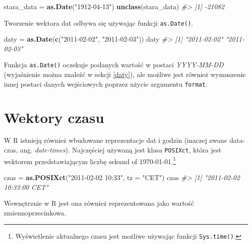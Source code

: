 \documentclass[paper=6in:9in,pagesize=pdftex,headinclude=on,footinclude=on,10pt]{scrbook}
\newenvironment{Shaded}{\begin{snugshade}}{\end{snugshade}}
\newcommand{\CommentTok}[1]{\textcolor[rgb]{0.56,0.35,0.01}{\textit{#1}}}
\newcommand{\DataTypeTok}[1]{\textcolor[rgb]{0.13,0.29,0.53}{#1}}
\newcommand{\KeywordTok}[1]{\textcolor[rgb]{0.13,0.29,0.53}{\textbf{#1}}}
\newcommand{\NormalTok}[1]{#1}
\newcommand{\StringTok}[1]{\textcolor[rgb]{0.31,0.60,0.02}{#1}}
\begin{document}
\begin{Shaded}
\begin{Highlighting}[]
\NormalTok{stara_data =}\StringTok{ }\KeywordTok{as.Date}\NormalTok{(}\StringTok{"1912-04-13"}\NormalTok{)}
\KeywordTok{unclass}\NormalTok{(stara_data)}
\CommentTok{#> [1] -21082}
\end{Highlighting}
\end{Shaded}

Tworzenie wektora dat odbywa się używając funkcji \texttt{as.Date()}.

\begin{Shaded}
\begin{Highlighting}[]
\NormalTok{daty =}\StringTok{ }\KeywordTok{as.Date}\NormalTok{(}\KeywordTok{c}\NormalTok{(}\StringTok{"2011-02-02"}\NormalTok{, }\StringTok{"2011-02-03"}\NormalTok{))}
\NormalTok{daty}
\CommentTok{#> [1] "2011-02-02" "2011-02-03"}
\end{Highlighting}
\end{Shaded}

Funkcja \texttt{as.Date()} oczekuje podanych wartość w postaci \emph{YYYY-MM-DD} (wyjaśnienie można znaleźć w sekcji \ref{daty}), ale możliwe jest również wymuszenie innej postaci danych wejściowych poprzez użycie argumentu \texttt{format}.

\hypertarget{ime}{%
\section{Wektory czasu}\label{ime}}

W R istnieją również wbudowane reprezentacje dat i godzin (inaczej zwane data-czas, ang. \emph{date-times}).
Najczęściej używaną jest klasa \texttt{POSIXct}, która jest wektorem przedstawiającym liczbę sekund of 1970-01-01.\footnote{Wyświetlenie aktualnego czasu jest możliwe używając funkcji \texttt{Sys.time()}.}

\begin{Shaded}
\begin{Highlighting}[]
\NormalTok{czas =}\StringTok{ }\KeywordTok{as.POSIXct}\NormalTok{(}\StringTok{"2011-02-02 10:33"}\NormalTok{, }\DataTypeTok{tz =} \StringTok{"CET"}\NormalTok{)}
\NormalTok{czas}
\CommentTok{#> [1] "2011-02-02 10:33:00 CET"}
\end{Highlighting}
\end{Shaded}

Wewnętrznie w R jest ona również reprezentowana jako wartość zmiennoprzecinkowa.

\begin{Shaded}
\end{Shaded}
\end{document}
